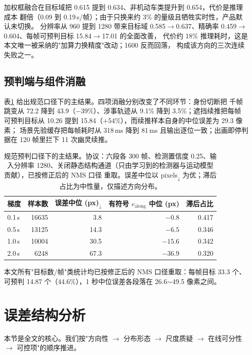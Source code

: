 \documentclass[11pt,a4paper]{ctexart}
\begin{document}
加权框融合在目标域把 0.615 提到 0.634、非机动车类提升到 0.654，代价是推理成本
翻倍（0.09 到 0.19\,s/帧）；由于只换来约 3\% 的量级且牺牲实时性，产品默认未切换。
分辨率从 960 提到 1280 带来目标域 0.585$\rightarrow$0.637、精确率
0.459$\rightarrow$0.604、每帧可预判目标 15.84$\rightarrow$17.01 的全面改善，
代价约 18\% 推理耗时，这是本文唯一被采纳的"加算力换精度"改动；1600 反而回落，
构成该方向的三次连续失败之一。

\subsection{预判端与组件消融}

表\ref{tab:main} 给出规范口径下的主结果。四项消融分别改变了不同环节：身份切断把
千帧跳变从 72.2 降到 43.9（$-39\%$）、涉事轨迹从 9.1\% 降到 3.5\%；遮挡续推把每帧
可预判目标从 10.26 提到 15.84（$+54\%$），而续推样本自身的中位误差为 29.3 像素；
场景先验缓存把每帧耗时从 318\,ms 降到 81\,ms 且输出逐位一致；出画即停判据在
120 帧里拦下 11 次幽灵续推。

\begin{table}[t]\centering\small
\caption{规范预判口径下的主结果。协议：六段各 300 帧、检测置信度 0.25、输入分辨率
1280、关闭静态结构通道（只由学习到的检测器与运动模型贡献），已按修正后的 NMS 口径
重取。误差中位以 pixels$_{\downarrow}$ 为优；滞后占比为中性量，仅描述方向分布。}
\label{tab:main}
\begin{tabular}{lrrrr}
\toprule
梯度 & 样本数 & 误差中位 (px)$_{\downarrow}$ & 有符号 $e_{\text{along}}$ 中位 (px) & 滞后占比 \\
\midrule
0.1\,s & 16635 & 3.8 & $-0.8$ & 0.417 \\
0.5\,s & 13125 & 14.3 & $-6.5$ & 0.346 \\
1.0\,s & 10004 & 30.5 & $-15.6$ & 0.342 \\
2.0\,s & 6248 & 67.3 & $-36.9$ & 0.320 \\
\bottomrule
\end{tabular}
\end{table}

本文所有"目标数/帧"类统计均已按修正后的 NMS 口径重取：每帧目标 33.3 个、
可预判 14.87 个（44.6\%），1 秒中位误差各段落在 26.6$\sim$49.5 像素之间。

\section{误差结构分析}
\label{sec:analysis}

本节是全文的核心。我们按"方向性 $\rightarrow$ 分布形态 $\rightarrow$ 尺度质疑
$\rightarrow$ 在线可分性 $\rightarrow$ 可控项"的顺序推进。
\end{document}
